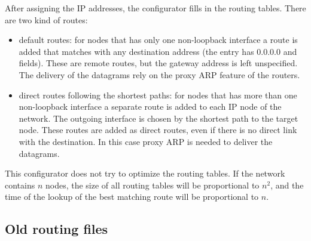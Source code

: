 After assigning the IP addresses, the configurator fills in the routing tables.
There are two kind of routes:
\begin{itemize}
  \item default routes: for nodes that has only one non-loopback interface
        a route is added that matches with any destination address
        (the entry has 0.0.0.0  and  fields).
        These are remote routes, but the gateway address is left unspecified.
        The delivery of the datagrams rely on the proxy ARP feature of the
        routers.
  \item direct routes following the shortest paths: for nodes that has more
        than one non-loopback interface a separate route is added to each
        IP node of the network. The outgoing interface is chosen by the
        shortest path to the target node. These routes are
        added as direct routes, even if there is no direct link with the
        destination. In this case proxy ARP is needed to deliver the datagrams.
\end{itemize}

\begin{note}
This configurator does not try to optimize the routing tables.
If the network contains $n$ nodes, the size of all routing tables
will be proportional to $n^2$, and the time of the lookup of the
best matching route will be proportional to $n$.
\end{note}



\subsection{Old routing files}
\label{subsec:routing_files}

